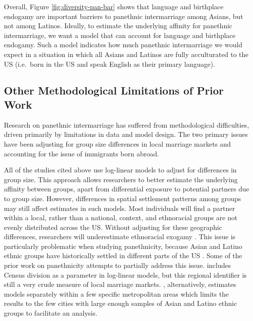 \documentclass[11pt,]{article}
\begin{document}
Overall, Figure \ref{fig:diversity-pan-bar} shows that language and birthplace endogamy are important barriers to panethnic intermarriage among Asians, but not among Latinos. Ideally, to estimate the underlying affinity for panethnic intermarriage, we want a model that can account for language and birthplace endogamy. Such a model indicates how much panethnic intermarriage we would expect in a situation in which all Asians and Latinos are fully acculturated to the US (i.e.~born in the US and speak English as their primary language).

\hypertarget{other-methodological-limitations-of-prior-work}{%
\subsection{Other Methodological Limitations of Prior Work}\label{other-methodological-limitations-of-prior-work}}

Research on panethnic intermarriage has suffered from methodological difficulties, driven primarily by limitations in data and model design. The two primary issues have been adjusting for group size differences in local marriage markets and accounting for the issue of immigrants born abroad.

All of the studies cited above use log-linear models to adjust for differences in group size. This approach allows researchers to better estimate the underlying affinity between groups, apart from differential exposure to potential partners due to group size. However, differences in spatial settlement patterns among groups may still affect estimates in such models. Most individuals will find a partner within a local, rather than a national, context, and ethnoracial groups are not evenly distributed across the US. Without adjusting for these geographic differences, researchers will underestimate ethnoracial exogamy \citep{harris_how_2005}. This issue is particularly problematic when studying panethnicity, because Asian and Latino ethnic groups have historically settled in different parts of the US \citep{massey_geographic_2008}. Some of the prior work on panethnicity attempts to partially address this issue. \citet{fu_how_2007a} includes Census division as a parameter in log-linear models, but this regional identifier is still a very crude measure of local marriage markets. \citet{rosenfeld_salience_2001}, alternatively, estimates models separately within a few specific metropolitan areas which limits the results to the few cities with large enough samples of Asian and Latino ethnic groups to facilitate an analysis.
\end{document}
